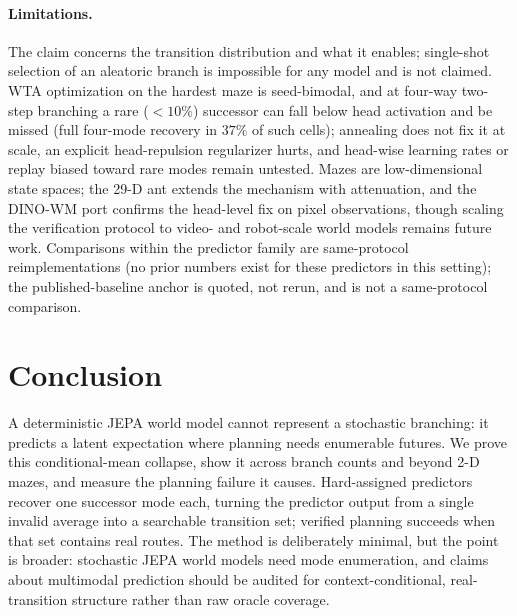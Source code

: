 \documentclass[letterpaper]{article}
\begin{document}
\paragraph{Limitations.}
The claim concerns the transition distribution and what it enables; single-shot selection of an aleatoric
branch is impossible for any model and is not claimed. WTA optimization on the hardest maze is
seed-bimodal, and at four-way two-step branching a rare ($<\!10\%$) successor can fall
below head activation and be missed (full four-mode recovery in $37\%$ of such cells); annealing does not
fix it at scale, an explicit head-repulsion
regularizer hurts, and head-wise learning rates or replay biased toward rare modes remain untested. Mazes are low-dimensional
state spaces; the 29-D ant extends the mechanism with attenuation, and the DINO-WM port
confirms the head-level fix on pixel observations, though scaling the verification protocol to video- and
robot-scale world models remains future work. Comparisons within the predictor family are same-protocol reimplementations (no prior numbers
exist for these predictors in this setting); the published-baseline anchor is quoted, not rerun, and is
not a same-protocol comparison.

\section{Conclusion}

A deterministic JEPA world model cannot represent a stochastic branching: it predicts a latent expectation
where planning needs enumerable futures. We prove this conditional-mean collapse, show it across branch
counts and beyond 2-D mazes, and measure the planning failure it causes. Hard-assigned predictors recover
one successor mode each, turning the predictor output from a single invalid average into a searchable
transition set; verified planning succeeds when that set contains real routes. The method is deliberately
minimal, but the point is broader: stochastic JEPA world models need mode enumeration, and claims about
multimodal prediction should be audited for context-conditional, real-transition structure rather than raw
oracle coverage.

\begingroup
\let\FloatBarrier\relax

\endgroup
\end{document}
